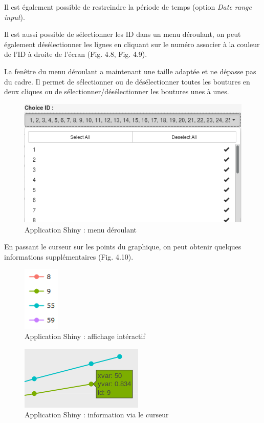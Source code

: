 \documentclass[]{article}
\begin{document}
Il est également possible de restreindre la période de temps (option
\emph{Date range input}).

Il est aussi possible de sélectionner les ID dans un menu déroulant, on
peut également désélectionner les lignes en cliquant sur le numéro
associer à la couleur de l'ID à droite de l'écran (Fig. 4.8, Fig. 4.9).

La fenêtre du menu déroulant a maintenant une taille adaptée et ne
dépasse pas du cadre. Il permet de sélectionner ou de désélectionner
toutes les boutures en deux cliques ou de sélectionner/désélectionner
les boutures unes à unes.

\begin{figure}[h!]
\includegraphics[]{../image/menu-deroulant.PNG}
\caption{Application Shiny : menu déroulant}
\end{figure}

En passant le curseur sur les points du graphique, on peut obtenir
quelques informations supplémentaires (Fig. 4.10).

\begin{figure}[h!]
\includegraphics[]{../image/shiny-selection.PNG}
\caption{Application Shiny : affichage intéractif}
\end{figure}

\begin{figure}[h!]
\includegraphics[]{../image/info-curseur.PNG}
\caption{Application Shiny : information via le curseur}
\end{figure}
\end{document}
